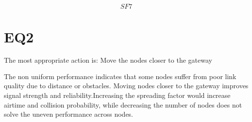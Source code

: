 \documentclass{article}
\begin{document}
\begin{equation}
\boxed{SF7}
\end{equation}

\section{EQ2}

The most appropriate action is: Move the nodes closer to the gateway

The non uniform performance indicates that some nodes suffer from poor link quality due to distance or obstacles. Moving nodes closer to the gateway improves signal strength and reliability.Increasing the spreading factor would increase airtime and collision probability, while decreasing the number of nodes does not solve the uneven performance across nodes.
\end{document}
